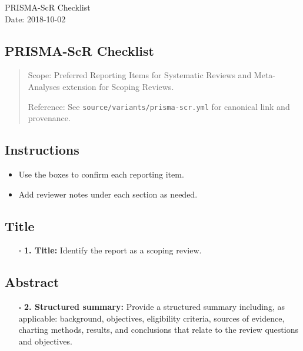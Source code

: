 \documentclass[11pt]{article}
\def\tightlist{}
\begin{document}
\begin{center}
{\LARGE PRISMA-ScR Checklist}\\[4pt]
\normalsize Date: 2018-10-02
\end{center}
\vspace{1em}

\begin{Form}

\section{PRISMA-ScR Checklist}\label{prisma-scr-checklist}

\begin{quote}
Scope: Preferred Reporting Items for Systematic Reviews and
Meta-Analyses extension for Scoping Reviews.

Reference: See \texttt{source/variants/prisma-scr.yml} for canonical
link and provenance.
\end{quote}

\subsection{Instructions}\label{instructions}

\begin{itemize}
\tightlist
\item
  Use the boxes to confirm each reporting item.
\item
  Add reviewer notes under each section as needed.
\end{itemize}

\subsection{Title}\label{title}

\begin{itemize}
\tightlist
\item[$\square$]
  \textbf{1. Title:} Identify the report as a scoping review.
\end{itemize}

\subsection{Abstract}\label{abstract}

\begin{itemize}
\tightlist
\item[$\square$]
  \textbf{2. Structured summary:} Provide a structured summary
  including, as applicable: background, objectives, eligibility
  criteria, sources of evidence, charting methods, results, and
  conclusions that relate to the review questions and objectives.
\end{itemize}


\end{Form}
\end{document}
